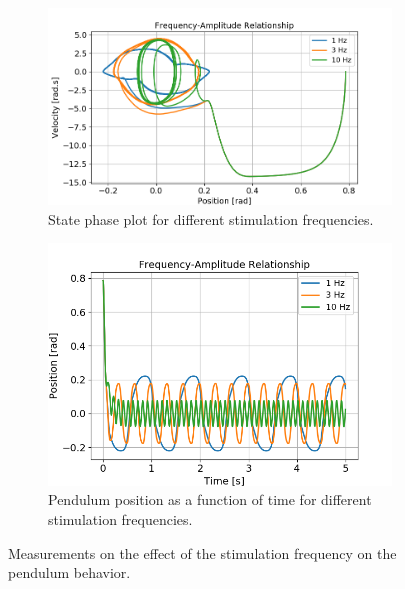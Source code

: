 \documentclass{cmc}
\begin{document}
\begin{figure}[ht]
  \begin{subfigure}[b]{0.48\textwidth}
    \includegraphics[width=\textwidth]{figures/ex2b-c/Pendulum_Phase_Plot_Frequency-Amplitude_Relationship.png}
    \caption{State phase plot for different stimulation frequencies.}
    \label{fig:ex2c-state-phase}
  \end{subfigure}
  \begin{subfigure}[b]{0.48\textwidth}
    \includegraphics[width=\textwidth]{figures/ex2b-c/Pendulum_State_Plot_Frequency-Amplitude_Relationship.png}
    \caption{Pendulum position as a function of time for different stimulation frequencies.}
    \label{fig:ex2c-state}
  \end{subfigure}
  \caption{Measurements on the effect of the stimulation frequency on the pendulum behavior.}
  \label{fig:ex2c}
\end{figure}
\end{document}
